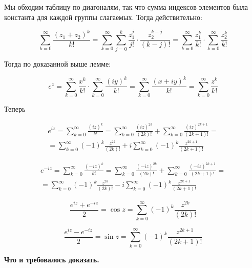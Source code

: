 \documentclass[a4paper,12pt]{article} %
\newcommand{\ryad}{\sum\limits^{\infty}_{k = 0}}
\begin{document}
Мы обходим таблицу по диагоналям, так что сумма индексов элементов была константа для каждой группы слагаемых. Тогда действительно:

$$
\ryad \frac{(z_1 + z_2)^k}{k!} = \ryad  \sum\limits_{j = 0}^k \frac{z_1^j}{j!} \cdot \frac{z_2^{k - j}}{(k - j)!} = \ryad \frac{z_1^k}{k!} \cdot \ryad \frac{z_2^k}{k!}
$$

Тогда по доказанной выше лемме:

$$
e^z = \ryad \frac{x^k}{k!} \cdot \ryad \frac{(iy)^k}{k!} = \ryad \frac{(x + iy)^k}{k!} = \ryad \frac{z^k}{k!}
$$

Теперь 

\begin{multline*}
e^{iz} = \ryad \frac{(iz)^k}{k!} = \ryad \frac{(iz)^{2k}}{(2k)!} + \ryad \frac{(iz)^{2k + 1}}{(2k + 1)!} = \\ = \ryad (-1)^k \frac{z^{2k}}{(2k)!} + i \ryad (-1)^k \frac{z^{2k + 1}}{(2k + 1)!}
\end{multline*}


\begin{multline*}
e^{-iz} = \ryad \frac{(-iz)^k}{k!} = \ryad \frac{(-iz)^{2k}}{(2k)!} + \ryad \frac{(-iz)^{2k + 1}}{(2k + 1)!} = \\ = \ryad (-1)^k \frac{z^{2k}}{(2k)!} - i \ryad (-1)^k \frac{z^{2k + 1}}{(2k + 1)!}
\end{multline*}

$$
\frac{e^{iz} + e^{-iz}}{2} = \cos z = \ryad (-1)^k \frac{z^{2k}}{(2k)!}
$$


$$
\frac{e^{iz} - e^{-iz}}{2} = \sin z = \ryad (-1)^k \frac{z^{2k + 1}}{(2k + 1)!}
$$

\textbf{Что и требовалось доказать.}

\end{document}
